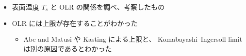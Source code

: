 \documentclass[aspectratio=149,9pt]{beamer}
\begin{document}
\begin{frame}
\begin{itemize}
\begin{columns}[c,onlytextwidth]
\begin{column}{.4\textwidth}
\begin{tabular}{rl}
						\hline
					\end{tabular}
				\end{column}
			\end{columns}
	\end{itemize}
	\begin{itemize}
		\item 表面温度 \(T_s\) と OLR の関係を調べ、考察したもの
		\item OLR には上限が存在することがわかった
			\begin{itemize}
				\item Abe and Matusi や Kasting による上限と、
					Komabayashi--Ingersoll limit は別の原因であるとわかった
			\end{itemize}
	\end{itemize}
\end{frame}
\end{document}
